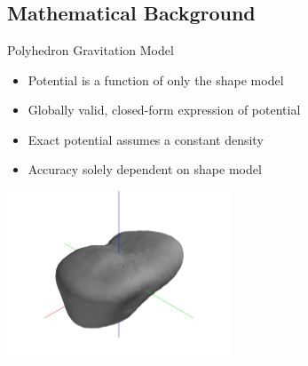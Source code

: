 \documentclass[11pt,professionalfonts]{beamer}
\begin{document}
\section*{}
\subsection*{Mathematical Background}
\begin{frame}{Polyhedron Gravitation Model}

\begin{itemize}
    \item Potential is a function of only the shape model
    \item Globally valid, closed-form expression of potential
    \item Exact potential assumes a constant density 
    \item Accuracy solely dependent on shape model
\end{itemize}

\begin{center}
    \includegraphics[width=0.5\textwidth,keepaspectratio]{figures/castalia/partial_2047.jpg}
\end{center}
\end{frame}
\end{document}

